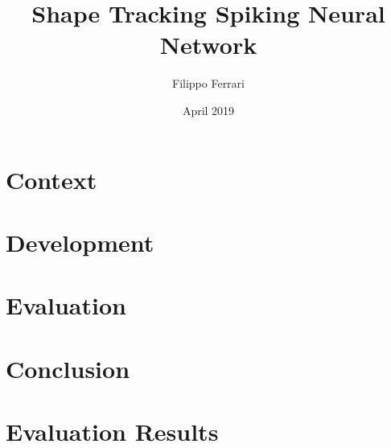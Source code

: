 \documentclass[12pt]{report}
\title{Shape Tracking Spiking Neural Network}
\author{Filippo Ferrari}
\date{April 2019}
\begin{document}







\tableofcontents

\listoffigures


\chapter{Context}
\setcounter{page}{1}

\label{sec:context}
\newpage

\chapter{Development}
\label{sec:development}

\newpage

\chapter{Evaluation}
\label{sec:evaluation}

\newpage

\chapter{Conclusion}
\label{sec:conclusion}

\newpage


\printbibliography[heading=bibintoc]

\appendix
\chapter{Evaluation Results}
\label{app:evaluation}

\end{document}
